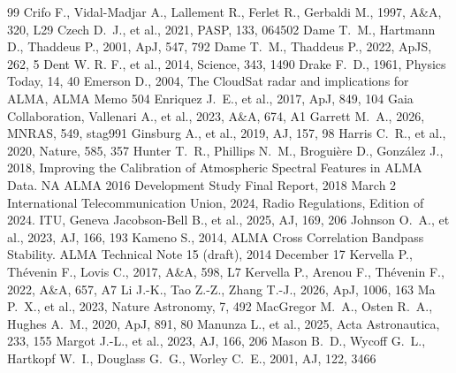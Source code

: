\documentclass[twocolumn,twocolappendix,numberedappendix,appendixfloats]{openjournal}
\begin{document}
\begin{thebibliography}{99}
 Crifo F., Vidal-Madjar A., Lallement R., Ferlet R., Gerbaldi M., 1997, A\&A, 320, L29
 Czech D.~J., et al., 2021, PASP, 133, 064502
 Dame T.~M., Hartmann D., Thaddeus P., 2001, ApJ, 547, 792
 Dame T.~M., Thaddeus P., 2022, ApJS, 262, 5
 Dent W. R. F., et al., 2014, Science, 343, 1490
 Drake F.~D., 1961, Physics Today, 14, 40
 Emerson D., 2004, The CloudSat radar and implications for ALMA, ALMA Memo 504
 Enriquez J.~E., et al., 2017, ApJ, 849, 104
 Gaia Collaboration, Vallenari A., et al., 2023, A\&A, 674, A1
 Garrett M.~A., 2026, MNRAS, 549, stag991
 Ginsburg A., et al., 2019, AJ, 157, 98
 Harris C.~R., et al., 2020, Nature, 585, 357
 Hunter T.~R., Phillips N.~M., Brogui\`{e}re D., Gonz\'{a}lez J., 2018, Improving the Calibration of Atmospheric Spectral Features in ALMA Data. NA ALMA 2016 Development Study Final Report, 2018 March 2
 International Telecommunication Union, 2024, Radio Regulations, Edition of 2024. ITU, Geneva
 Jacobson-Bell B., et al., 2025, AJ, 169, 206
 Johnson O.~A., et al., 2023, AJ, 166, 193
 Kameno S., 2014, ALMA Cross Correlation Bandpass Stability. ALMA Technical Note 15 (draft), 2014 December 17
 Kervella P., Th\'evenin F., Lovis C., 2017, A\&A, 598, L7
 Kervella P., Arenou F., Th\'evenin F., 2022, A\&A, 657, A7
 Li J.-K., Tao Z.-Z., Zhang T.-J., 2026, ApJ, 1006, 163
 Ma P.~X., et al., 2023, Nature Astronomy, 7, 492
 MacGregor M.~A., Osten R.~A., Hughes A.~M., 2020, ApJ, 891, 80
 Manunza L., et al., 2025, Acta Astronautica, 233, 155
 Margot J.-L., et al., 2023, AJ, 166, 206
 Mason B.~D., Wycoff G.~L., Hartkopf W.~I., Douglass G.~G., Worley C.~E., 2001, AJ, 122, 3466

\end{thebibliography}
\end{document}
